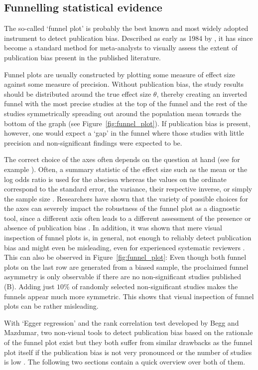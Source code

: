 \subsection{Funnelling statistical evidence}
\label{subsec:funnel plot}
The so-called `funnel plot' is probably the best known and most widely adopted instrument to detect publication bias. Described as early as 1984 by \citet[p.~64--69]{light_summing_1984}, it has since become a standard method for meta-analysts to visually assess the extent of publication bias present in the published literature.\par
Funnel plots are usually constructed by plotting some measure of effect size against some measure of precision. Without publication bias, the study results should be distributed around the true effect size $\theta$, thereby creating an inverted funnel with the most precise studies at the top of the funnel and the rest of the studies symmetrically spreading out around the population mean towards the bottom of the graph (see Figure~\ref{fig:funnel_plot}). If publication bias is present, however, one would expect a `gap' in the funnel where those studies with little precision and non-significant findings were expected to be.\par
The correct choice of the axes often depends on the question at hand (see for example \citet[p.~81--89]{sterne_funnel_2005}). Often, a summary statistic of the effect size such as the mean or the log odds ratio is used for the abscissa whereas the values on the ordinate correspond to the standard error, the variance, their respective inverse, or simply the sample size \citep{sterne_funnel_2001}. Researchers have shown that the variety of possible choices for the axes can severely impact the robustness of the funnel plot as a diagnostic tool, since a different axis often leads to a different assessment of the presence or absence of publication bias \citep{tang_misleading_2000, lau_case_2006}. In addition, it was shown that mere visual inspection of funnel plots is, in general, not enough to reliably detect publication bias and might even be misleading, even for experienced systematic reviewers \citep{terrin_empirical_2005}. This can also be observed in Figure~\ref{fig:funnel_plot}: Even though both funnel plots on the last row are generated from a biased sample, the proclaimed funnel asymmetry is only observable if there are no non-significant studies published (B). Adding just $10\%$ of randomly selected non-significant studies makes the funnels appear much more symmetric. This shows that visual inspection of funnel plots can be rather misleading.\par
With `Egger regression' and the rank correlation test developed by Begg and Mazdumar, two non-visual tools to detect publication bias based on the rationale of the funnel plot exist but they both suffer from similar drawbacks as the funnel plot itself if the publication bias is not very pronounced or the number of studies is low \citep{sterne_regression_2005}. The following two sections contain a quick overview over both of them.

